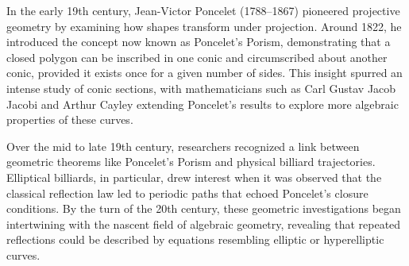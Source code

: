 \begin{historical}
In the early 19th century, Jean-Victor Poncelet (1788–1867) pioneered projective geometry by examining how shapes transform under projection. Around 1822, he introduced the concept now known as Poncelet’s Porism, demonstrating that a closed polygon can be inscribed in one conic and circumscribed about another conic, provided it exists once for a given number of sides. This insight spurred an intense study of conic sections, with mathematicians such as Carl Gustav Jacob Jacobi and Arthur Cayley extending Poncelet’s results to explore more algebraic properties of these curves.

Over the mid to late 19th century, researchers recognized a link between geometric theorems like Poncelet’s Porism and physical billiard trajectories. Elliptical billiards, in particular, drew interest when it was observed that the classical reflection law led to periodic paths that echoed Poncelet’s closure conditions. By the turn of the 20th century, these geometric investigations began intertwining with the nascent field of algebraic geometry, revealing that repeated reflections could be described by equations resembling elliptic or hyperelliptic curves.


\end{historical}